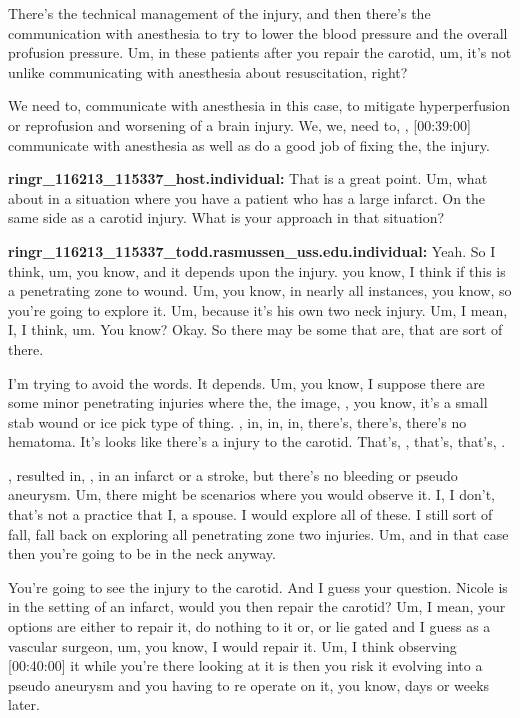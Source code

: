 \documentclass[
]{book}
\begin{document}
There's the technical management of the injury, and then there's the
communication with anesthesia to try to lower the blood pressure and the
overall profusion pressure. Um, in these patients after you repair the
carotid, um, it's not unlike communicating with anesthesia about
resuscitation, right?

We need to, communicate with anesthesia in this case, to mitigate
hyperperfusion or reprofusion and worsening of a brain injury. We, we,
need to, , {[}00:39:00{]} communicate with anesthesia as well as do a good
job of fixing the, the injury.

\textbf{ringr\_116213\_115337\_host.individual:} That is a great point. Um, what
about in a situation where you have a patient who has a large infarct.
On the same side as a carotid injury. What is your approach in that
situation?

\textbf{ringr\_116213\_115337\_todd.rasmussen\_uss.edu.individual:} Yeah. So I
think, um, you know, and it depends upon the injury. you know, I think
if this is a penetrating zone to wound. Um, you know, in nearly all
instances, you know, so you're going to explore it. Um, because it's his
own two neck injury. Um, I mean, I, I think, um. You know? Okay. So
there may be some that are, that are sort of there.

I'm trying to avoid the words. It depends. Um, you know, I suppose there
are some minor penetrating injuries where the, the image, , you know,
it's a small stab wound or ice pick type of thing. , in, in, in,
there's, there's, there's no hematoma. It's looks like there's a injury
to the carotid. That's, , that's, that's, .

, resulted in, , in an infarct or a stroke, but there's no bleeding or
pseudo aneurysm. Um, there might be scenarios where you would observe
it. I, I don't, that's not a practice that I, a spouse. I would explore
all of these. I still sort of fall, fall back on exploring all
penetrating zone two injuries. Um, and in that case then you're going to
be in the neck anyway.

You're going to see the injury to the carotid. And I guess your
question. Nicole is in the setting of an infarct, would you then repair
the carotid? Um, I mean, your options are either to repair it, do
nothing to it or, or lie gated and I guess as a vascular surgeon, um,
you know, I would repair it. Um, I think observing {[}00:40:00{]} it while
you're there looking at it is then you risk it evolving into a pseudo
aneurysm and you having to re operate on it, you know, days or weeks
later.
\end{document}
